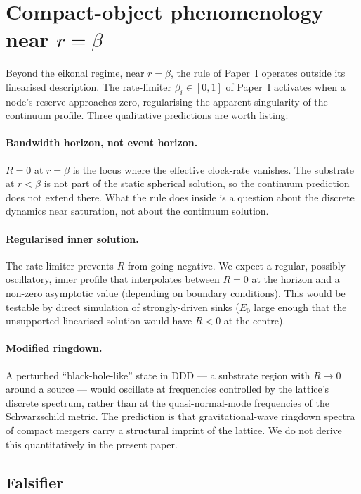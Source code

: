 \documentclass[11pt,a4paper]{article}
\begin{document}
\section{Compact-object phenomenology near $r = \beta$}
\label{sec:compact}

Beyond the eikonal regime, near $r = \beta$, the rule of Paper~I
operates outside its linearised description. The rate-limiter
$\beta_i \in [0, 1]$ of Paper~I activates when a node's reserve
approaches zero, regularising the apparent singularity of the
continuum profile. Three qualitative predictions are worth listing:

\paragraph{Bandwidth horizon, not event horizon.}
$R = 0$ at $r = \beta$ is the locus where the effective clock-rate
vanishes. The substrate at $r < \beta$ is not part of the static
spherical solution, so the continuum prediction does not extend there.
What the rule does inside is a question about the discrete dynamics
near saturation, not about the continuum solution.

\paragraph{Regularised inner solution.}
The rate-limiter prevents $R$ from going negative. We expect a
regular, possibly oscillatory, inner profile that interpolates between
$R = 0$ at the horizon and a non-zero asymptotic value (depending on
boundary conditions). This would be testable by direct simulation of
strongly-driven sinks ($E_0$ large enough that the unsupported
linearised solution would have $R < 0$ at the centre).

\paragraph{Modified ringdown.}
A perturbed ``black-hole-like'' state in DDD --- a substrate region
with $R \to 0$ around a source --- would oscillate at frequencies
controlled by the lattice's discrete spectrum, rather than at the
quasi-normal-mode frequencies of the Schwarzschild metric. The
prediction is that gravitational-wave ringdown spectra of compact
mergers carry a structural imprint of the lattice. We do not derive
this quantitatively in the present paper.

\subsection{Falsifier}
\end{document}
